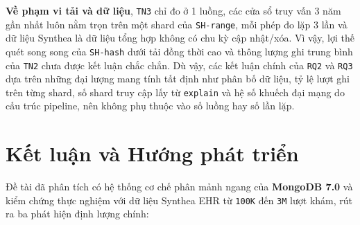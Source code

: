 \textbf{Về phạm vi tải và dữ liệu}, \texttt{TN3} chỉ đo ở 1 luồng, các cửa sổ truy vấn 3 năm gần nhất luôn nằm trọn trên một shard của \texttt{SH-range}, mỗi phép đo lặp 3 lần và dữ liệu Synthea là dữ liệu tổng hợp không có chu kỳ cập nhật/xóa. Vì vậy, lợi thế quét song song của \texttt{SH-hash} dưới tải đồng thời cao và thông lượng ghi trung bình của \texttt{TN2} chưa được kết luận chắc chắn. Dù vậy, các kết luận chính của \texttt{RQ2} và \texttt{RQ3} dựa trên những đại lượng mang tính tất định như phân bố dữ liệu, tỷ lệ lượt ghi trên từng shard, số shard truy cập lấy từ \texttt{explain} và hệ số khuếch đại mạng do cấu trúc pipeline, nên không phụ thuộc vào số luồng hay số lần lặp.

\section{Kết luận và Hướng phát triển}
\label{sec:future}

Đề tài đã phân tích có hệ thống cơ chế phân mảnh ngang của \textbf{MongoDB 7.0} và kiểm chứng thực nghiệm với dữ liệu Synthea EHR từ \texttt{100K} đến \texttt{3M} lượt khám, rút ra ba phát hiện định lượng chính:

